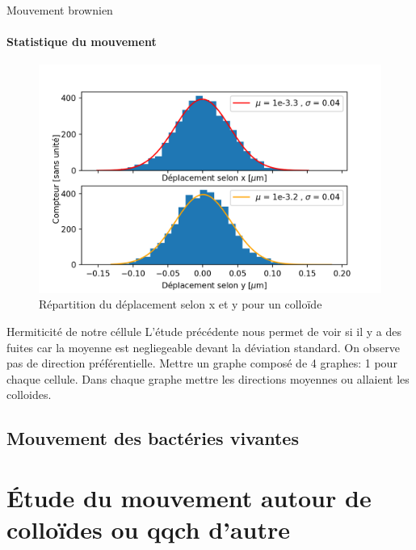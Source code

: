 \documentclass[11pt]{beamer}
\begin{document}
\begin{frame}{Mouvement brownien}
\framesubtitle{Statistique du mouvement}
\begin{figure}
	\centering
	\includegraphics[width=0.9\linewidth]{StatDepl_brownian}
	\caption{Répartition du déplacement selon x et y pour un colloïde}
	\label{fig:statdeplbrownian}
\end{figure}

\end{frame}


\begin{frame}{Hermiticité de notre céllule}
L'étude précédente nous permet de voir si il y a des fuites car la moyenne est negliegeable devant la déviation standard. On observe pas de direction préférentielle. Mettre un graphe composé de 4 graphes: 1 pour chaque cellule. Dans chaque graphe mettre les directions moyennes ou allaient les colloides.
\end{frame}

\subsection{Mouvement des bactéries vivantes}


\section{Étude du mouvement autour de colloïdes ou qqch d'autre}
\end{document}
